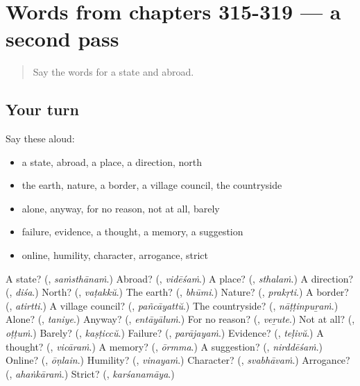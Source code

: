 \section[(dialogue)]{Words from chapters 315-319 — a second pass}

\label{lesson:ML-R319-second-pass-words-from-chapters-315-319}



\begin{quote}
Say the words for a state and abroad.
\end{quote}

\subsection*{Your turn}
Say these aloud:

\begin{itemize}
\raggedright
  \item a state, abroad, a place, a direction, north
  \item the earth, nature, a border, a village council, the countryside
  \item alone, anyway, for no reason, not at all, barely
  \item failure, evidence, a thought, a memory, a suggestion
  \item online, humility, character, arrogance, strict
\end{itemize}

\begin{tcolorbox}[breakable,colback=teal!4,colframe=teal!35!black,title={Before you move on}]
A state? (\textbf{}, \emph{saṁsthānaṁ}.) Abroad? (\textbf{}, \emph{vidēśaṁ}.) A place? (\textbf{}, \emph{sthalaṁ}.) A direction? (\textbf{}, \emph{diśa}.) North? (\textbf{}, \emph{vaṭakkŭ}.) The earth? (\textbf{}, \emph{bhūmi}.) Nature? (\textbf{}, \emph{prakṛti}.) A border? (\textbf{}, \emph{atirtti}.) A village council? (\textbf{}, \emph{pañcāyattŭ}.) The countryside? (\textbf{}, \emph{nāṭṭinpuṟaṁ}.) Alone? (\textbf{}, \emph{taniye}.) Anyway? (\textbf{}, \emph{entāyāluṁ}.) For no reason? (\textbf{}, \emph{veṟute}.) Not at all? (\textbf{}, \emph{oṭṭuṁ}.) Barely? (\textbf{}, \emph{kaṣṭiccŭ}.) Failure? (\textbf{}, \emph{parājayaṁ}.) Evidence? (\textbf{}, \emph{teḷivŭ}.) A thought? (\textbf{}, \emph{vicāraṁ}.) A memory? (\textbf{}, \emph{ōrmma}.) A suggestion? (\textbf{}, \emph{nirddēśaṁ}.) Online? (\textbf{}, \emph{ōṇlain}.) Humility? (\textbf{}, \emph{vinayaṁ}.) Character? (\textbf{}, \emph{svabhāvaṁ}.) Arrogance? (\textbf{}, \emph{ahaṅkāraṁ}.) Strict? (\textbf{}, \emph{karśanamāya}.)
\end{tcolorbox}

